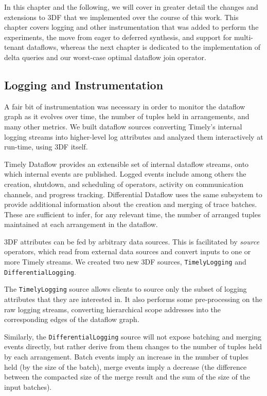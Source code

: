 \documentclass[../index.tex]{subfiles}
\begin{document}
In this chapter and the following, we will cover in greater detail the
changes and extensions to 3DF that we implemented over the course of
this work. This chapter covers logging and other instrumentation that
was added to perform the experiments, the move from eager to deferred
synthesis, and support for multi-tenant dataflows, whereas the next
chapter is dedicated to the implementation of delta queries and our
worst-case optimal dataflow join operator.

\subsection{Logging and Instrumentation} \label{logging}

A fair bit of instrumentation was necessary in order to monitor the
dataflow graph as it evolves over time, the number of tuples held in
arrangements, and many other metrics. We built dataflow sources
converting Timely's internal logging streams into higher-level log
attributes and analyzed them interactively at run-time, using 3DF
itself.

Timely Dataflow provides an extensible set of internal dataflow
streams, onto which internal events are published. Logged events
include among others the creation, shutdown, and scheduling of
operators, activity on communication channels, and progress
tracking. Differential Dataflow uses the same subsystem to provide
additional information about the creation and merging of trace
batches. These are sufficient to infer, for any relevant time, the
number of arranged tuples maintained at each arrangement in the
dataflow.

3DF attributes can be fed by arbitrary data sources. This is
facilitated by \emph{source} operators, which read from external data
sources and convert inputs to one or more Timely streams. We created
two new 3DF sources, \texttt{TimelyLogging} and
\texttt{DifferentialLogging}.

The \texttt{TimelyLogging} source allows clients to source only the
subset of logging attributes that they are interested in. It also
performs some pre-processing on the raw logging streams, converting
hierarchical scope addresses into the corresponding edges of the
dataflow graph.

Similarly, the \texttt{DifferentialLogging} source will not expose
batching and merging events directly, but rather derive from them
changes to the number of tuples held by each arrangement. Batch events
imply an increase in the number of tuples held (by the size of the
batch), merge events imply a decrease (the difference between the
compacted size of the merge result and the sum of the size of the
input batches).
\end{document}
